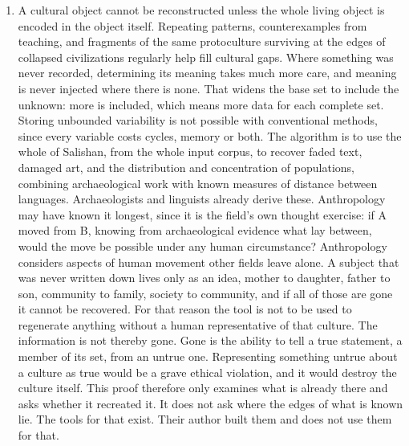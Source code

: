 \begin{enumerate}
\item A cultural object cannot be reconstructed unless the whole living object is encoded in the object
itself. Repeating patterns, counterexamples from teaching, and fragments of the same protoculture
surviving at the edges of collapsed civilizations regularly help fill cultural gaps. Where something
was never recorded, determining its meaning takes much more care, and meaning is never injected where
there is none. That widens the base set to include the unknown: more is included, which means more
data for each complete set. Storing unbounded variability is not possible with conventional methods,
since every variable costs cycles, memory or both. The algorithm is to use the whole of Salishan, from
the whole input corpus, to recover faded text, damaged art, and the distribution and concentration of
populations, combining archaeological work with known measures of distance between languages.
Archaeologists and linguists already derive these. Anthropology may have known it longest, since it is
the field's own thought exercise: if A moved from B, knowing from archaeological evidence what lay
between, would the move be possible under any human circumstance? Anthropology considers aspects of
human movement other fields leave alone. A subject that was never written down lives only as an idea,
mother to daughter, father to son, community to family, society to community, and if all of those are
gone it cannot be recovered. For that reason the tool is not to be used to regenerate anything without
a human representative of that culture. The information is not thereby gone. Gone is the ability
to tell a true statement, a member of its set, from an untrue one. Representing something untrue
about a culture as true would be a grave ethical violation, and it would destroy the culture itself.
This proof therefore only examines what is already there and asks whether it recreated it. It does not
ask where the edges of what is known lie. The tools for that exist. Their author built them and does
not use them for that.
\end{enumerate}
